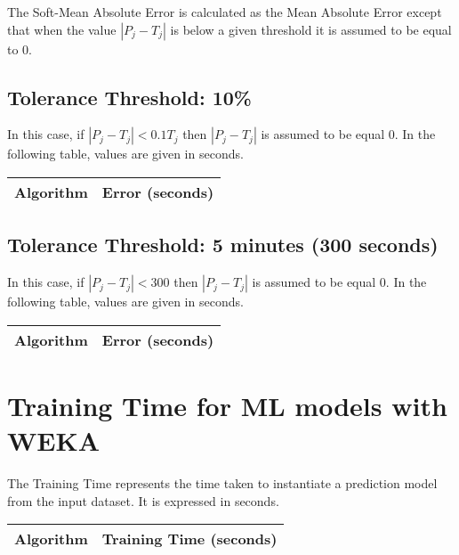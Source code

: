 \documentclass[10pt,a4paper]{article}
\begin{document}
The Soft-Mean Absolute Error is calculated as the Mean Absolute Error except that when the value $|P_j-T_j |$ is below a given threshold it is assumed to be equal to 0.

\subsection{Tolerance Threshold: 10\%}

In this case, if $|P_j-T_j |<0.1 T_j$ then $|P_j-T_j |$ is assumed to be equal 0. In the following table, values are given in seconds.

\begin{center}
\begin{tabular}{cc}
\toprule
\textbf{Algorithm} & \textbf{Error (seconds)} \\
\midrule

\bottomrule
\end{tabular}
\end{center}



\subsection{Tolerance Threshold: 5 minutes (300 seconds)}

In this case, if  $|P_j-T_j |<300$ then $|P_j-T_j |$ is assumed to be equal 0. In the following table, values are given in seconds.

\begin{center}
\begin{tabular}{cc}
\toprule
\textbf{Algorithm} & \textbf{Error (seconds)} \\
\midrule

\bottomrule
\end{tabular}
\end{center}



\section{Training Time for ML models with WEKA}

The Training Time represents the time taken to instantiate a prediction model from the input dataset. It is expressed in seconds.

\begin{center}
\begin{tabular}{cc}
\toprule
\textbf{Algorithm} & \textbf{Training Time (seconds)} \\
\midrule

\bottomrule
\end{tabular}
\end{center}
\end{document}
